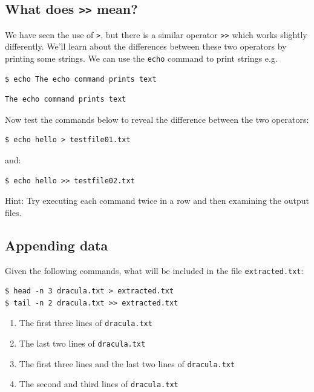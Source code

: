\documentclass[
]{krantz}
\providecommand{\tightlist}{%
  \setlength{\itemsep}{0pt}\setlength{\parskip}{0pt}}
\begin{document}
\hypertarget{bash-tools-ex-redirect-append}{%
\subsection{\texorpdfstring{What does \texttt{\textgreater{}\textgreater{}} mean?}{What does \textgreater\textgreater{} mean?}}\label{bash-tools-ex-redirect-append}}

We have seen the use of \texttt{\textgreater{}}, but there is a similar operator \texttt{\textgreater{}\textgreater{}} which works slightly differently.
We'll learn about the differences between these two operators by printing some strings.
We can use the \texttt{echo} command to print strings e.g.

\begin{verbatim}
$ echo The echo command prints text
\end{verbatim}

\begin{verbatim}
The echo command prints text
\end{verbatim}

Now test the commands below to reveal the difference between the two operators:

\begin{verbatim}
$ echo hello > testfile01.txt
\end{verbatim}

and:

\begin{verbatim}
$ echo hello >> testfile02.txt
\end{verbatim}

Hint: Try executing each command twice in a row and then examining the output files.

\hypertarget{bash-tools-ex-append-data}{%
\subsection{Appending data}\label{bash-tools-ex-append-data}}

Given the following commands,
what will be included in the file \texttt{extracted.txt}:

\begin{verbatim}
$ head -n 3 dracula.txt > extracted.txt
$ tail -n 2 dracula.txt >> extracted.txt
\end{verbatim}

\begin{enumerate}
\def\labelenumi{\arabic{enumi}.}
\tightlist
\item
  The first three lines of \texttt{dracula.txt}
\item
  The last two lines of \texttt{dracula.txt}
\item
  The first three lines and the last two lines of \texttt{dracula.txt}
\item
  The second and third lines of \texttt{dracula.txt}
\end{enumerate}
\end{document}

